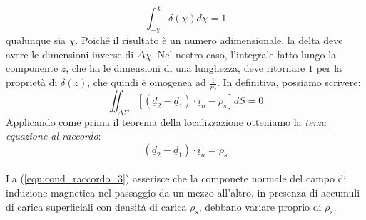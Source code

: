 \documentclass{book}
\begin{document}
        \begin{equation}
            \int ^{\chi} _{-\chi} \delta(\chi) d\chi = 1
        \end{equation}
        qualunque sia $\chi$. Poiché il risultato è un numero adimensionale, la delta deve avere le dimensioni inverse di $\Delta \chi$. Nel nostro caso, l'integrale fatto lungo la componente $z$, che ha le dimensioni di una lunghezza, deve ritornare $1$ per la proprietà di $\delta (z)$, che quindi è omogenea ad $\displaystyle \frac{1}{m}$.
        In definitiva, possiamo scrivere:
        \begin{equation}
            \iint_{\Delta \Sigma} [(\underline{d}_{2}-\underline{d}_{1}) \cdot \underline{i}_{n} -\rho_{s}]dS = 0
        \end{equation}
        Applicando come prima il teorema della localizzazione otteniamo la \textit{terza equazione al raccordo}:
        \begin{equation}
        \label{eqn:cond_raccordo_3}
            (\underline{d}_{2}-\underline{d}_{1}) \cdot \underline{i}_{n} = \rho_{s}
        \end{equation} \\
        La (\ref{eqn:cond_raccordo_3}) asserisce che la componete normale del campo di induzione magnetica nel passaggio da un mezzo all'altro, in presenza di accumuli di carica superficiali con densità di carica $\rho_{s}$, debbano variare proprio di $\rho_{s}$.
        \newpage
\end{document}
